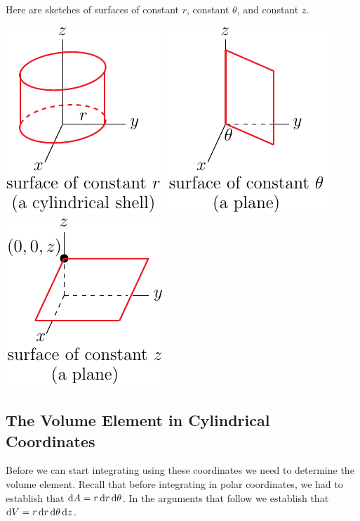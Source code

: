 Here are sketches of surfaces of constant $r$, constant $\theta$, and constant $z$.
\begin{wfig}
\begin{center}
    \includegraphics{figures/coord/cyl3.pdf}\qquad
    \includegraphics{figures/coord/cyl4.pdf}\qquad
    \includegraphics{figures/coord/cyl2.pdf}
\end{center}
\end{wfig}

\subsection{The Volume Element in Cylindrical Coordinates} \label{sec cylindrical vol}
 Before we can start integrating using these coordinates 
we need to determine the volume element. Recall that before integrating
in polar coordinates, we had to establish that 
$\mathrm{d}A=r\,\mathrm{d}r\,\mathrm{d}\theta$. In the arguments that follow we establish 
that $\mathrm{d}V =r\,\mathrm{d}r\,\mathrm{d}\theta\,\mathrm{d}z$.

